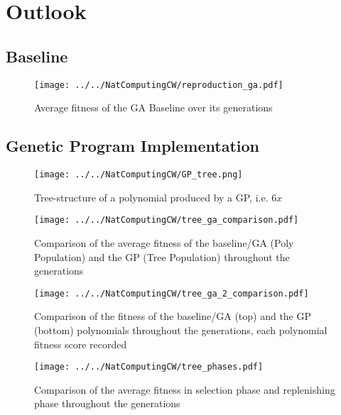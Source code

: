 \documentclass[11pt,a4paper]{article}
\begin{document}
\section*{Outlook}

\begin{appendices}
\subsection*{Baseline}
\begin{figure}[h]
\centering
\texttt{[image: ../../NatComputingCW/reproduction\_ga.pdf]} 
\caption{Average fitness of the GA Baseline over its generations}
\label{fig:baseline}
\end{figure}

\subsection*{Genetic Program Implementation}
\begin{figure}[h]
\centering
\texttt{[image: ../../NatComputingCW/GP\_tree.png]} 
\caption{Tree-structure of a polynomial produced by a GP, i.e. $6x$}
\label{fig:syntax_tree}
\end{figure}

\begin{figure}[h]
\centering
\texttt{[image: ../../NatComputingCW/tree\_ga\_comparison.pdf]} 
\caption{Comparison of the average fitness of the baseline/GA (Poly Population) and the GP (Tree Population) throughout the generations}
\label{fig:tree_ga_comparison}
\end{figure}

\begin{figure}[h]
\centering
\texttt{[image: ../../NatComputingCW/tree\_ga\_2\_comparison.pdf]} 
\caption{Comparison of the fitness of the baseline/GA (top) and the GP (bottom) polynomials throughout the generations, each polynomial fitness score recorded}
\label{fig:tree_ga_comparison_2}
\end{figure}

\begin{figure}[h]
\centering
\texttt{[image: ../../NatComputingCW/tree\_phases.pdf]} 
\caption{Comparison of the average fitness in selection phase and replenishing phase throughout the generations}
\label{fig:tree_phases}
\end{figure}


\end{appendices}
\end{document}

